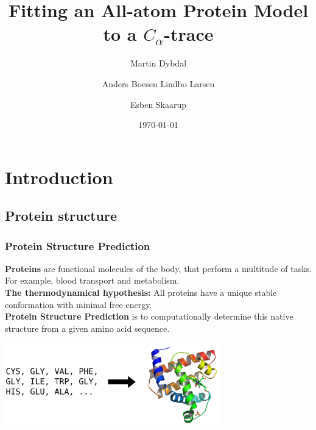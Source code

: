 \documentclass{beamer}
\title{Fitting an All-atom Protein Model to a $C_{\alpha}$-trace}
\author{\small Martin Dybdal \and Anders Boesen Lindbo Larsen \and Esben Skaarup}
\institute{\textrm{Datalogisk Institut, Københavns Universitet}}
\date{\today}
\begin{document}
\frame{\titlepage}

\section{Introduction}
\subsection{Protein structure}

\begin{frame}[t, fragile]
  \frametitle{Protein Structure Prediction}
  \textbf{Proteins} are functional molecules of the body, that perform a
    multitude of tasks. For example, blood transport and metabolism.
\\\vspace*{2mm}
\textbf{The thermodynamical hypothesis:} All proteins have a unique
    stable conformation with minimal free energy.
\\\vspace*{2mm}
\textbf{Protein Structure Prediction} is to computationally
    determine this native structure from a given amino acid sequence.

    \begin{center}
      \includegraphics[width=0.7\textwidth]{psp.pdf}
    \end{center}
\end{frame}
\end{document}
